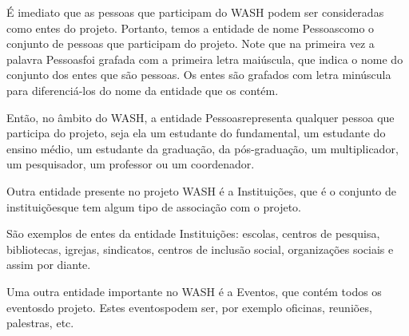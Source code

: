 \documentclass[
12pt,		%
openright,	%
twoside,  %
a4paper,			%
chapter=TITLE,		%
english,			%
french,				%
spanish,			%
brazil				%
]{USPSC-classe/USPSC_RedarTex}
\begin{document}
\'E imediato que as pessoas que participam do WASH podem ser consideradas como entes do projeto. Portanto, temos a entidade de nome \textquotedbl Pessoas\textquotedbl  como o conjunto de pessoas que participam do projeto. Note que na primeira vez a palavra \textquotedbl Pessoas\textquotedbl  foi grafada com a primeira letra mai\'uscula, que indica o nome do conjunto dos entes que s\~ao pessoas. Os entes s\~ao grafados com letra min\'uscula para diferenci\'a-los do nome da entidade que os cont\'em.










Ent\~ao, no \^ambito do WASH, a entidade \textquotedbl Pessoas\textquotedbl  representa qualquer pessoa que participa do projeto, seja ela um estudante do fundamental, um estudante do ensino m\'edio, um estudante da gradua\c{c}\~ao, da p\'os-gradua\c{c}\~ao, um multiplicador, um pesquisador, um professor ou um coordenador.










Outra entidade presente no projeto WASH \'e a \textquotedbl Institui\c{c}\~oes\textquotedbl , que \'e o conjunto de \textquotedbl institui\c{c}\~oes\textquotedbl  que tem algum tipo de associa\c{c}\~ao com o projeto.










S\~ao exemplos de entes da entidade \textquotedbl Institui\c{c}\~oes\textquotedbl : escolas, centros de pesquisa, bibliotecas, igrejas, sindicatos, centros de inclus\~ao social, organiza\c{c}\~oes sociais e assim por diante.










Uma outra entidade importante no WASH \'e a \textquotedbl Eventos\textquotedbl , que cont\'em todos os \textquotedbl eventos\textquotedbl  do projeto. Estes \textquotedbl eventos\textquotedbl  podem ser, por exemplo \textquotedbl oficinas\textquotedbl , \textquotedbl reuni\~oes\textquotedbl , \textquotedbl palestras\textquotedbl , etc.
\end{document}
